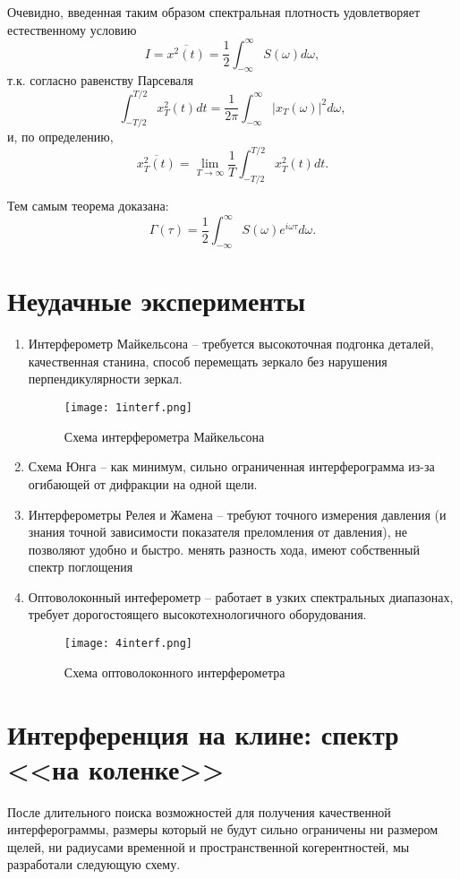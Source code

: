 \documentclass{urticle}
\begin{document}
Очевидно, введенная таким образом спектральная плотность удовлетворяет естественному условию
$$I = \overline{x^2(t)} = \frac{1}{2} \int_{-\infty}^{\infty} S(\omega) d\omega,$$
т.к. согласно равенству Парсеваля
$$ \int_{-T/2}^{T/2} x_T^2(t)dt = \frac{1}{2\pi} \int_{-\infty}^{\infty} |x_T(\omega)|^2 d \omega,$$
и, по определению,
$$
\overline{x_T^2(t)} = \lim\limits_{T\rightarrow\infty} \frac{1}{T} \int_{-T/2}^{T/2} x_T^2(t) dt.$$

Тем самым теорема доказана:
$$\boxed{\Gamma(\tau) = \frac{1}{2}\int_{-\infty}^{\infty} S(\omega) e^{i\omega \tau} d \omega.}$$


\newpage
\section*{Неудачные эксперименты}
\begin{enumerate}
	\item Интерферометр Майкельсона -- требуется высокоточная подгонка деталей, качественная станина, способ перемещать зеркало без нарушения перпендикулярности зеркал.
	\begin{figure}[H]
	\centering
  	\texttt{[image: 1interf.png]}
  \caption{Схема интерферометра Майкельсона}
  \end{figure}
	\item Схема Юнга -- как минимум, сильно ограниченная интерферограмма из-за огибающей от дифракции на одной щели.
	\item Интерферометры Релея и Жамена -- требуют точного измерения давления (и знания точной зависимости показателя преломления от давления), не позволяют удобно и быстро. менять разность хода, имеют собственный спектр поглощения
	\item Оптоволоконный интеферометр -- работает в узких спектральных диапазонах, требует дорогостоящего высокотехнологичного оборудования.
	\begin{figure}[H]
	\centering
  	\texttt{[image: 4interf.png]}
  \caption{Схема оптоволоконного интерферометра}
  \end{figure}
\end{enumerate}

\newpage
\section*{Интерференция на клине: спектр <<на коленке>>}
    После длительного поиска возможностей для получения качественной интерферограммы, размеры который не будут сильно ограничены ни размером щелей, ни радиусами временной и пространственной когерентностей, мы разработали следующую схему.
	
\end{document}
